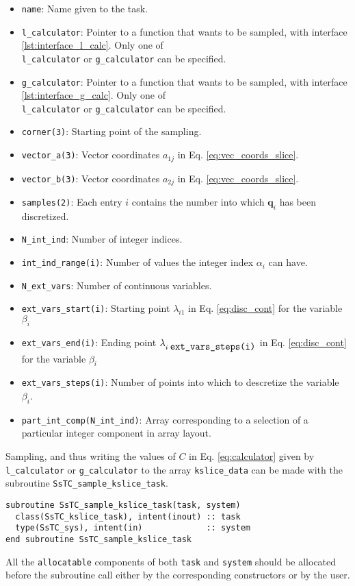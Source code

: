 \documentclass[10pt,a4paper]{article}
\begin{document}
\begin{itemize}
\item \verb|name|: Name given to the task.
\item \verb|l_calculator|: Pointer to a function that wants to be sampled, with interface \ref{lst:interface_l_calc}. Only one of \\ \verb|l_calculator| or \verb|g_calculator| can be specified.
\item \verb|g_calculator|: Pointer to a function that wants to be sampled, with interface \ref{lst:interface_g_calc}. Only one of \\ \verb|l_calculator| or \verb|g_calculator| can be specified.
\item \verb|corner(3)|: Starting point of the sampling.
\item \verb|vector_a(3)|: Vector coordinates $a_{1j}$ in Eq. \eqref{eq:vec_coords_slice}.
\item \verb|vector_b(3)|: Vector coordinates $a_{2j}$ in Eq. \eqref{eq:vec_coords_slice}.
\item \verb|samples(2)|: Each entry $i$ contains the number into which $\bm{q}_i$ has been discretized.
\item \verb|N_int_ind|: Number of integer indices.
\item \verb|int_ind_range(i)|: Number of values the integer index $\alpha_i$ can have.
\item \verb|N_ext_vars|: Number of continuous variables.
\item \verb|ext_vars_start(i)|: Starting point $\lambda_{i1}$ in Eq. \eqref{eq:disc_cont} for the variable $\beta_i$
\item \verb|ext_vars_end(i)|: Ending point $\lambda_{i\;\verb|ext_vars_steps(i)|}$ in Eq. \eqref{eq:disc_cont} for the variable $\beta_i$
\item \verb|ext_vars_steps(i)|: Number of points into which to descretize the variable $\beta_i$.
\item \verb|part_int_comp(N_int_ind)|: Array corresponding to a selection of a particular integer component in array layout.
\end{itemize}
Sampling, and thus writing the values of $C$ in Eq. \eqref{eq:calculator} given by \verb|l_calculator| or \verb|g_calculator| to the array \verb|kslice_data| can be made with the subroutine \verb|SsTC_sample_kslice_task|.
\begin{lstlisting}[caption={Interface of the ``kslice" sampler.},captionpos=b]
subroutine SsTC_sample_kslice_task(task, system)
  class(SsTC_kslice_task), intent(inout) :: task
  type(SsTC_sys), intent(in)             :: system
end subroutine SsTC_sample_kslice_task
\end{lstlisting}
All the \verb|allocatable| components of both \verb|task| and \verb|system| should be allocated before the subroutine call either by the corresponding constructors or by the user.
\end{document}
